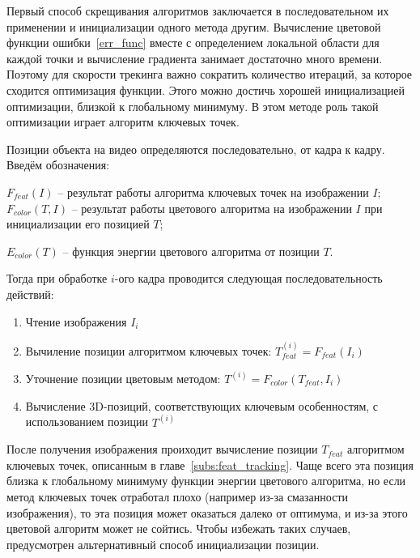 
Первый способ скрещивания алгоритмов заключается в последовательном их
применении и инициализации одного метода другим.
Вычисление цветовой функции ошибки~\ref{err_func} вместе с определением
локальной области для каждой точки и вычисление градиента занимает достаточно
много времени.
Поэтому для скорости трекинга важно сократить количество итераций, за которое
сходится оптимизация функции.
Этого можно достичь хорошей инициализацией оптимизации, близкой к глобальному
минимуму.
В этом методе роль такой оптимизации играет алгоритм ключевых точек.


Позиции объекта на видео определяются последовательно, от кадра к кадру.
Введём обозначения:

$F_{feat}(I)$ -- результат работы алгоритма ключевых точек на изображении $I$;
$F_{color}(T, I)$ -- результат работы цветового алгоритма на изображении $I$
при инициализации его позицией $T$;

$E_{color}(T)$ -- функция энергии цветового алгоритма от позиции $T$.

Тогда при обработке $i$-ого кадра проводится следующая последовательность
действий:

\begin{enumerate}
\item Чтение изображения $I_i$
\item Вычиление позиции алгоритмом ключевых точек:
    $T_{feat}^{(i)} = F_{feat}(I_i)$
\item Уточнение позиции цветовым методом:
    $T^{(i)} = F_{color}(T_{feat}, I_i)$
\item Вычисление  3D-позиций, соответствующих ключевым особенностям, с
    использованием позиции $T^{(i)}$
\end{enumerate}

После получения изображения проиходит вычисление позиции $T_{feat}$ алгоритмом
ключевых точек, описанным в главе~\ref{subs:feat_tracking}.
Чаще всего эта позиция близка к глобальному минимуму функции энергии цветового
алгоритма, но если метод ключевых точек отработал плохо (например из-за
смазанности изображения), то эта позиция может оказаться далеко от оптимума, и
из-за этого цветовой алгоритм может не сойтись.
Чтобы избежать таких случаев, предусмотрен альтернативный способ инициализации
позиции.

